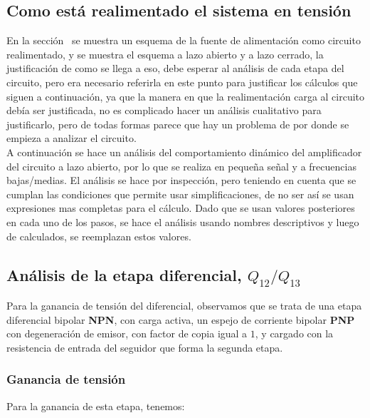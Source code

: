 
\label{section:voltage_loop}


\subsection{Como está realimentado el sistema en tensión}

En la sección~ se muestra un esquema de la fuente de alimentación como circuito realimentado, y se muestra el esquema a lazo abierto y a lazo cerrado, la justificación de como se llega a eso, debe esperar al análisis de cada etapa del circuito, pero era necesario referirla en este punto para justificar los cálculos que siguen a continuación, ya que la manera en que la realimentación carga al circuito debía ser justificada, no es complicado hacer un análisis cualitativo para justificarlo, pero de todas formas parece que hay un problema de por donde se empieza a analizar el circuito.\\


A continuación se hace un análisis del comportamiento dinámico del amplificador del circuito a lazo abierto, por lo que se realiza en pequeña señal y a frecuencias bajas/medias.
El análisis se hace por inspección, pero teniendo en cuenta que se cumplan las condiciones que permite usar simplificaciones, de no ser así se usan expresiones mas completas para el cálculo. Dado que se usan valores posteriores en cada uno de los pasos, se hace el análisis usando nombres descriptivos y luego de calculados, se reemplazan estos valores.

\subsection{Análisis de la etapa diferencial, $Q_{12}/Q_{13}$}

Para la ganancia de tensión del diferencial, observamos que se trata de una etapa diferencial bipolar \textbf{NPN}, con carga activa, un espejo de corriente bipolar \textbf{PNP} con degeneración de emisor, con factor de copia igual a $1$, y cargado con la resistencia de entrada del seguidor que forma la segunda etapa.\\

\subsubsection{Ganancia de tensión}

Para la ganancia de esta etapa, tenemos:

